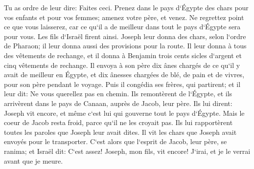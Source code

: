 \verse Tu as ordre de leur dire: Faites ceci. Prenez dans le pays d`Égypte des chars pour vos enfants et pour vos femmes; amenez votre père, et venez. 
\verse Ne regrettez point ce que vous laisserez, car ce qu`il a de meilleur dans tout le pays d`Égypte sera pour vous. 
\verse Les fils d`Israël firent ainsi. Joseph leur donna des chars, selon l`ordre de Pharaon; il leur donna aussi des provisions pour la route. 
\verse Il leur donna à tous des vêtements de rechange, et il donna à Benjamin trois cents sicles d`argent et cinq vêtements de rechange. 
\verse Il envoya à son père dix ânes chargés de ce qu`il y avait de meilleur en Égypte, et dix ânesses chargées de blé, de pain et de vivres, pour son père pendant le voyage. 
\verse Puis il congédia ses frères, qui partirent; et il leur dit: Ne vous querellez pas en chemin. 
\verse Ils remontèrent de l`Égypte, et ils arrivèrent dans le pays de Canaan, auprès de Jacob, leur père. 
\verse Ils lui dirent: Joseph vit encore, et même c`est lui qui gouverne tout le pays d`Égypte. Mais le coeur de Jacob resta froid, parce qu`il ne les croyait pas. 
\verse Ils lui rapportèrent toutes les paroles que Joseph leur avait dites. Il vit les chars que Joseph avait envoyés pour le transporter. C`est alors que l`esprit de Jacob, leur père, se ranima; 
\verse et Israël dit: C`est assez! Joseph, mon fils, vit encore! J`irai, et je le verrai avant que je meure. 

